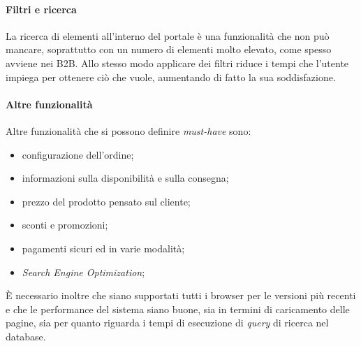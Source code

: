 \paragraph{Filtri e ricerca}
La ricerca di elementi all'interno del portale è una funzionalità che non può mancare, soprattutto con un numero di elementi molto elevato, come spesso avviene nei B2B. Allo stesso modo applicare dei filtri riduce i tempi che l'utente impiega per ottenere ciò che vuole, aumentando di fatto la sua soddisfazione.

\paragraph{Altre funzionalità}
Altre funzionalità che si possono definire \textit{must-have} sono:
\begin{itemize}
	\item configurazione dell'ordine;
	\item informazioni sulla disponibilità e sulla consegna;
	\item prezzo del prodotto pensato sul cliente;
	\item sconti e promozioni;
	\item pagamenti sicuri ed in varie modalità;
	\item \textit{Search Engine Optimization};
\end{itemize}
È necessario inoltre che siano supportati tutti i browser per le versioni più recenti e che le performance del sistema siano buone, sia in termini di caricamento delle pagine, sia per quanto riguarda i tempi di esecuzione di \textit{query} di ricerca nel database.

